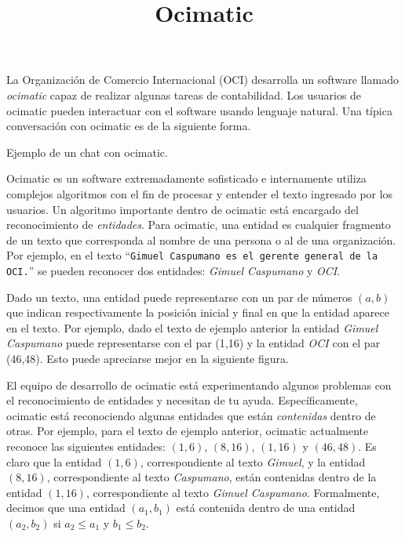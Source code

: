 \documentclass{oci}
\title{Ocimatic}
\begin{document}
\begin{problemDescription}
La Organización de Comercio Internacional (OCI) desarrolla un software llamado
\emph{ocimatic} capaz de realizar algunas tareas de contabilidad.
Los usuarios de ocimatic pueden interactuar con el software usando lenguaje
natural.
Una típica conversación con ocimatic es de la siguiente forma.

\begin{center}
  Ejemplo de un chat con ocimatic.
\end{center}

Ocimatic es un software extremadamente sofisticado e internamente utiliza
complejos algoritmos con el fin de procesar y entender el texto ingresado por
los usuarios.
Un algoritmo importante dentro de ocimatic está encargado del reconocimiento de
\emph{entidades}.
Para ocimatic, una entidad es cualquier fragmento de un texto que
corresponda al nombre de una persona o al de una organización.
Por ejemplo, en el texto ``\texttt{Gimuel Caspumano es el gerente general
  de la OCI.}''
se pueden reconocer dos entidades: \emph{Gimuel Caspumano} y \emph{OCI}.

Dado un texto, una entidad puede representarse con un par de números
$(a,b)$ que indican respectivamente la posición inicial y final en que la
entidad aparece en el texto.
Por ejemplo, dado el texto de ejemplo anterior la entidad \emph{Gimuel Caspumano}
puede representarse con el par (1,16) y la entidad \emph{OCI} con el par
(46,48).
Esto puede apreciarse mejor en la siguiente figura.

\vspace{1em}
\vspace{0.5em}

El equipo de desarrollo de ocimatic está experimentando algunos problemas con
el reconocimiento de entidades y necesitan de tu ayuda.
Específicamente, ocimatic está reconociendo algunas entidades que están
\emph{contenidas} dentro de otras.
Por ejemplo, para el texto de ejemplo anterior, ocimatic actualmente reconoce las
siguientes entidades: $(1, 6)$, $(8, 16)$, $(1, 16)$ y $(46, 48)$.
Es claro que la entidad $(1, 6)$, correspondiente al texto \emph{Gimuel}, y la
entidad $(8, 16)$, correspondiente al texto \emph{Caspumano}, están
contenidas dentro de la entidad $(1, 16)$, correspondiente al texto \emph{Gimuel
  Caspumano}.
Formalmente, decimos que una entidad $(a_1,b_1)$ está contenida dentro de una
entidad $(a_2,b_2)$ si $a_2\leq a_1$ y $b_1\leq b_2$.


\end{problemDescription}
\end{document}
